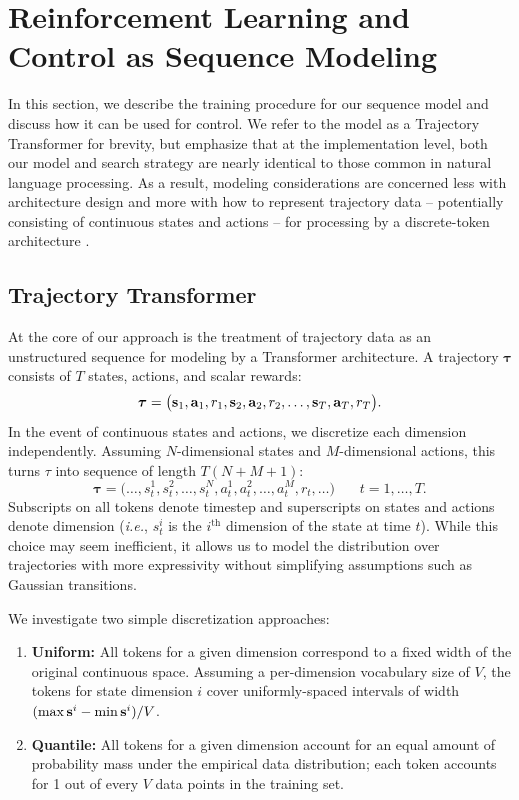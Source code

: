 \section{Reinforcement Learning and Control as Sequence Modeling}
\label{sec:method}

In this section, we describe the training procedure for our sequence model and discuss how it can be used for control.
We refer to the model as a Trajectory Transformer for brevity, but emphasize that at the implementation level, both our model and search strategy are nearly identical to those common in natural language processing.
As a result, modeling considerations are concerned less with architecture design and more with how to represent trajectory data -- potentially consisting of continuous states and actions -- for processing by a discrete-token architecture \citep{radford2018improving}.

\subsection{Trajectory Transformer}

At the core of our approach is the treatment of trajectory data as an unstructured sequence for modeling by a Transformer architecture.
A trajectory $\bm{\tau}$ consists of $T$ states, actions, and scalar rewards:
\[
    \bm{\tau} = \big( \mathbf{s}_1, \mathbf{a}_1, r_1, \mathbf{s}_2, \mathbf{a}_2, r_2, \ldots, \mathbf{s}_T, \mathbf{a}_T, r_T \big).
\]
In the event of continuous states and actions, we discretize each dimension independently. Assuming $N$-dimensional states and $M$-dimensional actions, this turns $\tau$ into sequence of length $T(N+M+1)$:
\[
\bm{\tau} = \big(\ldots, s_t^1, s_t^2, \ldots, s_t^{N}, a_t^1, a_t^2, \ldots, a_t^{M}, r_t, \ldots \big)~~~~~~~~ t=1, \ldots, T.
\]
Subscripts on all tokens denote timestep and superscripts on states and actions denote dimension (\emph{i.e.}, $s_t^i$ is the $i^\text{th}$ dimension of the state at time $t$).
While this choice may seem inefficient, it allows us to model the distribution over trajectories with more expressivity without simplifying assumptions such as Gaussian transitions. 



We investigate two simple discretization approaches:

\begin{enumerate}
    \item \textbf{Uniform:} All tokens for a given dimension correspond to a fixed width of the original continuous space. Assuming a per-dimension vocabulary size of $V$, the tokens for state dimension $i$ cover uniformly-spaced intervals of width $(\max \mathbf{s}^i - \min \mathbf{s}^i)/ V$.
    \item \textbf{Quantile:} All tokens for a given dimension account for an equal amount of probability mass under the empirical data distribution; each token accounts for 1 out of every $V$ data points in the training set.
\end{enumerate}


